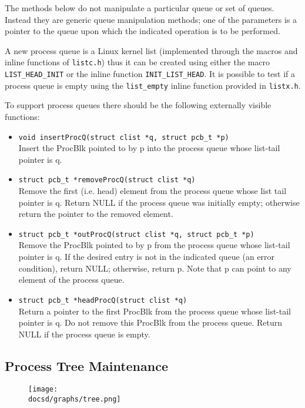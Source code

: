 The methods below do not manipulate a particular queue or set of queues.
Instead they are generic queue manipulation methods; one of the parameters is a pointer to the queue upon which the indicated operation is to be performed.

A new process queue is a Linux kernel list (implemented through the macros and inline functions of \verb+listc.h+) thus it can be created using either the macro \verb+LIST_HEAD_INIT+ or the inline function \verb+INIT_LIST_HEAD+.
It is possible to test if a process queue is empty using the \verb+list_empty+ inline function provided in \verb+listx.h+.

To support process queues there should be the following externally visible functions:
\begin{itemize}
	\item \verb+void insertProcQ(struct clist *q, struct pcb_t *p)+\\
		Insert the ProcBlk pointed to by p into the process queue whose list-tail pointer is q.
	\item \verb+struct pcb_t *removeProcQ(struct clist *q)+\\
		Remove the first (i.e. head) element from the process queue whose list tail pointer is q. Return NULL if the process queue was initially empty; otherwise return the pointer to the removed element.
	\item \verb+struct pcb_t *outProcQ(struct clist *q, struct pcb_t *p)+\\
		Remove the ProcBlk pointed to by p from the process queue whose list-tail pointer is q. 
		If the desired entry is not in the indicated queue (an error condition), return NULL; otherwise, return p. Note that p can point to any element of the process queue.
	\item \verb+struct pcb_t *headProcQ(struct clist *q)+\\
		Return a pointer to the first ProcBlk from the process queue whose list-tail pointer is q. 
		Do not remove this ProcBlk from the process queue.
		Return NULL if the process queue is empty.
\end{itemize}

\subsection{Process Tree Maintenance}

\begin{figure}[htbp]
	\centering
	\texttt{[image: \\docsd/graphs/tree.png]}
	\caption*{}
\end{figure}

